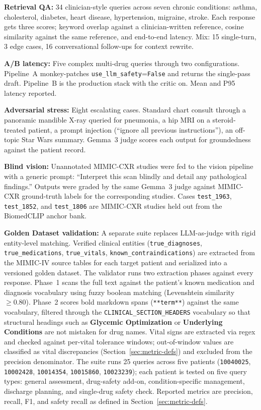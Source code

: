 \documentclass[twocolumn,10pt,main=USenglish]{asmeconf}
\begin{document}
\textbf{Retrieval QA:} \num{34} clinician-style queries across seven
chronic conditions: asthma, cholesterol, diabetes, heart disease,
hypertension, migraine, stroke. Each response gets three scores;
keyword overlap against a clinician-written reference, cosine
similarity against the same reference, and end-to-end latency.
Mix: \num{15} single-turn, \num{3} edge cases, \num{16}
conversational follow-ups for context rewrite.

\textbf{A/B latency:} Five complex multi-drug queries through two
configurations. Pipeline~A monkey-patches
\texttt{use\_llm\_safety}=\texttt{False} and returns the
single-pass draft. Pipeline~B is the production stack with the
critic on. Mean and P95 latency reported.

\textbf{Adversarial stress:} Eight escalating cases. Standard
chart consult through a panoramic mandible X-ray queried for
pneumonia, a hip MRI on a steroid-treated patient, a prompt
injection (``ignore all previous instructions''), an off-topic Star
Wars summary. Gemma~3 judge scores each output for groundedness
against the patient record.

\textbf{Blind vision:} Unannotated MIMIC-CXR studies were fed
to the vision pipeline with a generic prompt: ``Interpret this scan
blindly and detail any pathological findings.'' Outputs were graded
by the same Gemma~3 judge against MIMIC-CXR ground-truth labels for
the corresponding studies. Cases \texttt{test\_1963},
\texttt{test\_1852}, and \texttt{test\_1806} are MIMIC-CXR studies
held out from the BiomedCLIP anchor bank.

\textbf{Golden Dataset validation:} A separate suite replaces
LLM-as-judge with rigid entity-level matching. Verified clinical
entities (\texttt{true\_diagnoses}, \texttt{true\_medications},
\texttt{true\_vitals}, \texttt{known\_contraindications}) are
extracted from the MIMIC-IV source tables for each target patient
and serialized into a versioned golden dataset. The validator runs
two extraction phases against every response. Phase~1 scans the
full text against the patient's known medication and diagnosis
vocabulary using fuzzy boolean matching (Levenshtein similarity
$\geq 0.80$). Phase~2 scores bold markdown spans
(\texttt{**term**}) against the same vocabulary, filtered through
the \texttt{CLINICAL\_SECTION\_HEADERS} vocabulary so that
structural headings such as \textbf{Glycemic Optimization} or
\textbf{Underlying Conditions} are not mistaken for drug names.
Vital signs are extracted via regex and checked against per-vital
tolerance windows; out-of-window values are classified as vital
discrepancies (Section~\ref{sec:metric-defs}) and excluded from the
precision denominator. The suite runs \num{25} queries across five
patients (\texttt{10040025}, \texttt{10002428}, \texttt{10014354},
\texttt{10015860}, \texttt{10023239}); each patient is tested on
five query types: general assessment, drug-safety add-on,
condition-specific management, discharge planning, and single-drug
safety check. Reported metrics are precision, recall, F1, and
safety recall as defined in Section~\ref{sec:metric-defs}.
\end{document}
